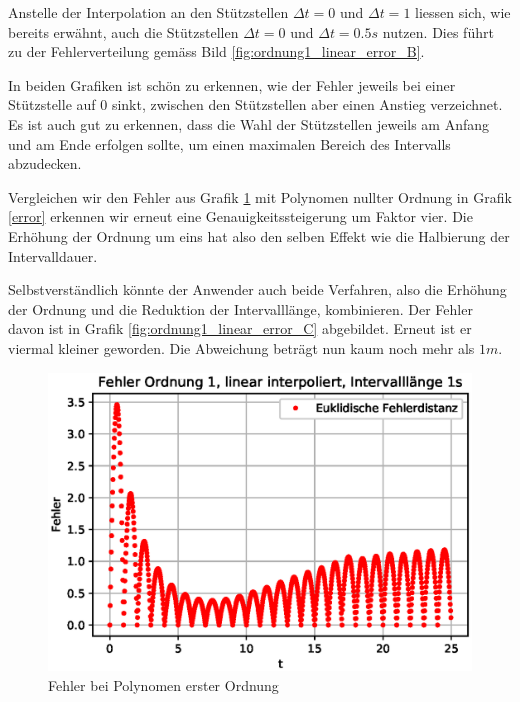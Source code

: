 Anstelle der Interpolation an den Stützstellen $\Delta t = 0$ und $\Delta t = 1$ liessen sich, wie bereits erwähnt, auch die Stützstellen $\Delta t = 0$ und $\Delta t = 0.5s$ nutzen.
Dies führt zu der Fehlerverteilung gemäss Bild \ref{fig:ordnung1_linear_error_B}.

In beiden Grafiken ist schön zu erkennen, wie der Fehler jeweils bei einer Stützstelle auf $0$ sinkt, zwischen den Stützstellen aber einen Anstieg verzeichnet.
Es ist auch gut zu erkennen, dass die Wahl der Stützstellen jeweils am Anfang und am Ende erfolgen sollte, um einen maximalen Bereich des Intervalls abzudecken.

Vergleichen wir den Fehler aus Grafik \ref{fig:ordnung1_linear_error_A} mit Polynomen nullter Ordnung in Grafik \ref{error} erkennen wir erneut eine Genauigkeitssteigerung um Faktor vier.
Die Erhöhung der Ordnung um eins hat also den selben Effekt wie die Halbierung der Intervalldauer.

Selbstverständlich könnte der Anwender auch beide Verfahren, also die Erhöhung der Ordnung und die Reduktion der Intervalllänge, kombinieren.
Der Fehler davon ist in Grafik \ref{fig:ordnung1_linear_error_C} abgebildet.
Erneut ist er viermal kleiner geworden.
Die Abweichung beträgt nun kaum noch mehr als $1m$.

\begin{figure}
	\centering
	\includegraphics[scale=0.7]{papers/perturbation/bilder/perturbation_fig6.eps}
	\caption{Fehler bei Polynomen erster Ordnung}
	\label{fig:ordnung1_linear_error_A}
\end{figure}

